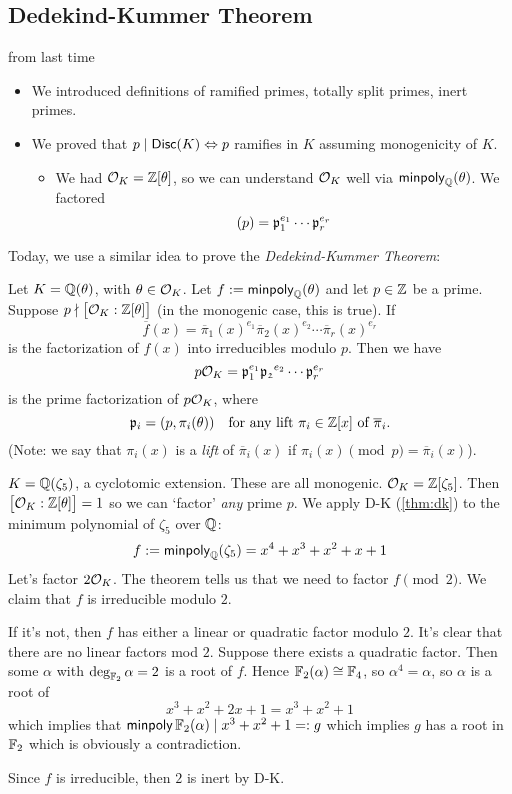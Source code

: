 \subsection{Dedekind-Kummer Theorem}
\recall from last time
\begin{itemize}
    \item We introduced definitions of ramified primes, totally split primes, inert primes.
    \item We proved that $p\mid \operatorname{\mathsf{Disc}}(K)\Leftrightarrow p$ ramifies in $K$ assuming monogenicity of $K$.
          \begin{itemize}
              \item We had $\mathcal{O}_K = \mathbb Z[\theta]$, so we can understand $\mathcal{O}_K$ well via $\operatorname{\mathsf{minpoly}}_\mathbb Q(\theta)$. We factored
                    \[(p) = \mathfrak{p}_1^{e_1}\cdots \mathfrak{p}_r^{e_r}\]
          \end{itemize}
\end{itemize}
Today, we use a similar idea to prove the \emph{Dedekind-Kummer Theorem}:
\begin{theorem}\label{thm:dk}
    Let $K = \mathbb Q(\theta)$, with $\theta\in\mathcal{O}_K$. Let $f:=\operatorname{\mathsf{minpoly}}_\mathbb Q(\theta)$ and let $p\in\mathbb Z$ be a prime. Suppose $p\nmid \big[\mathcal{O}_K : \mathbb Z[\theta]\big]$ (in the monogenic case, this is true). If
    \[\overline{f}(x) = \overline{\pi}_1(x)^{e_1}\overline{\pi}_2(x)^{e_2}\cdots \overline{\pi}_r(x)^{e_r}\]
    is the factorization of $f(x)$ into irreducibles modulo $p$. Then we have
    \[p\mathcal{O}_K = \mathfrak{p}_1^{e_1}\mathfrak{p_2}^{e_2}\cdots \mathfrak{p}_r^{e_r}\]
    is the prime factorization of $p\mathcal{O}_K$, where
    \[\mathfrak{p}_i = (p, \pi_i(\theta))\quad\text{for any lift $\pi_i\in\mathbb Z[x]$ of $\overline{\pi}_i$.}\]
    (Note: we say that $\pi_i(x)$ is a \emph{lift} of $\overline{\pi}_i(x)$ if $\pi_i(x)\pmod{p} = \overline{\pi}_i(x)$).
\end{theorem}
\begin{example}
    $K = \mathbb Q(\zeta_5)$, a cyclotomic extension. These are all monogenic. $\mathcal{O}_K = \mathbb Z[\zeta_5]$. Then $\big[\mathcal{O}_K : \mathbb Z[\theta]\big] = 1$ so we can `factor' \emph{any} prime $p$. We apply D-K (\cref{thm:dk}) to the minimum polynomial of $\zeta_5$ over $\mathbb Q$:
    \[f := \operatorname{\mathsf{minpoly}}_\mathbb Q(\zeta_5) = x^4 + x^3 + x^2 + x + 1\]
    Let's factor $2\mathcal{O}_K$. The theorem tells us that we need to factor $f\pmod{2}$. We claim that $f$ is irreducible modulo $2$.

    If it's not, then $f$ has either a linear or quadratic factor modulo $2$. It's clear that there are no linear factors mod $2$. Suppose there exists a quadratic factor. Then some $\alpha$ with $\deg_{\mathbb F_2}\alpha = 2$ is a root of $f$. Hence $\mathbb F_2(\alpha)\cong \mathbb F_4$, so $\alpha^4 = \alpha$, so $\alpha$ is a root of
    \[x^3 + x^2 + 2x + 1 = x^3 + x^2 + 1\]
    which implies that $\operatorname{\mathsf{minpoly}}\mathbb F_2(\alpha)\mid x^3 + x^2 + 1 =: g$ which implies $g$ has a root in $\mathbb F_2$ which is obviously a contradiction.

    Since $f$ is irreducible, then $2$ is inert by D-K.
\end{example}
